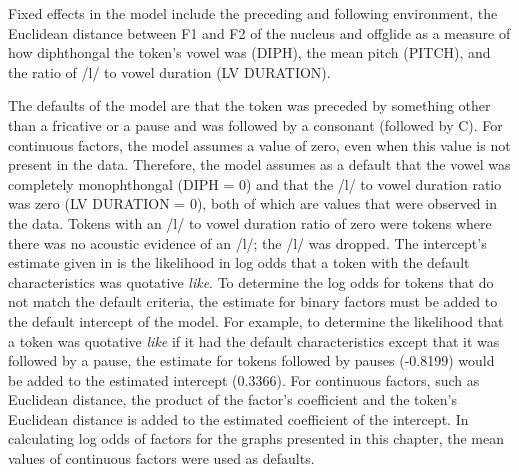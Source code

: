 Fixed effects in the model include the preceding and following environment, the Euclidean distance between F1 and F2 of the nucleus and offglide as a measure of how diphthongal the token's vowel was (DIPH), the mean pitch (PITCH), and the ratio of /l/ to vowel duration (LV DURATION). 
 
The defaults of the model are that the token was preceded by something other than a fricative or a pause and was followed by a consonant (followed by C). For continuous factors, the model assumes a value of zero, even when this value is not present in the data. Therefore, the model assumes as a default that the vowel was completely monophthongal (DIPH = 0) and that the /l/ to vowel duration ratio was zero (LV DURATION = 0), both of which are values that were observed in the data. Tokens with an /l/ to vowel duration ratio of zero were tokens where there was no acoustic evidence of an /l/; the /l/ was dropped. The intercept's estimate given in  is the likelihood in log odds that a token with the default characteristics was quotative \textit{like}. To determine the log odds for tokens that do not match the default criteria, the estimate for binary factors must be added to the default intercept of the model. For example, to determine the likelihood that a token was quotative \textit{like} if it had the default characteristics except that it was followed by a pause, the estimate for tokens followed by pauses (-0.8199) would be added to the estimated intercept (0.3366). For continuous factors, such as Euclidean distance, the product of the factor's coefficient and the token's Euclidean distance is added to the estimated coefficient of the intercept. In calculating log odds of factors for the graphs presented in this chapter, the mean values of continuous factors were used as defaults.

